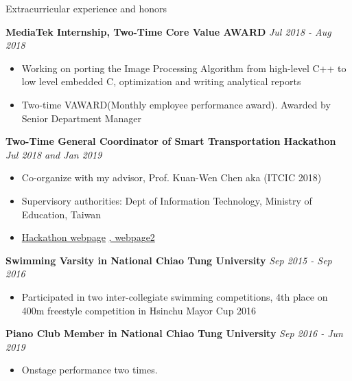 \documentclass{resume} %
\begin{document}
\begin{rSection}{Extracurricular experience and honors}

{\bf MediaTek Internship, Two-Time Core Value AWARD} \hfill {\em Jul 2018 - Aug 2018}
\begin{itemize}
    \item Working on porting the Image Processing Algorithm from high-level C++ to low level embedded C, optimization and writing analytical reports
    \item Two-time VAWARD(Monthly employee performance award). Awarded by Senior Department Manager
\end{itemize}

{\bf Two-Time General Coordinator of Smart Transportation Hackathon } \hfill {\em Jul 2018 and Jan 2019}
\begin{itemize}
    \item Co-organize with my advisor, Prof. Kuan-Wen Chen aka (ITCIC 2018)
    \item Supervisory authorities: Dept of Information Technology, Ministry of Education, Taiwan
    \item \href{http://covis.cs.nctu.edu.tw/ITCIC2018/}{Hackathon webpage} \href{http://covis.cs.nctu.edu.tw/ITCIC2018/}{, webpage2}
\end{itemize}

{\bf Swimming Varsity in National Chiao Tung University} \hfill {\em Sep 2015 - Sep 2016}
\begin{itemize}
    \item Participated in two inter-collegiate swimming competitions, 4th place on 400m freestyle competition in Hsinchu Mayor Cup 2016
\end{itemize}

{\bf Piano Club Member in National Chiao Tung University} \hfill {\em Sep 2016 - Jun 2019}
\begin{itemize}
    \item Onstage performance two times.
\end{itemize}

\end{rSection}
\end{document}
